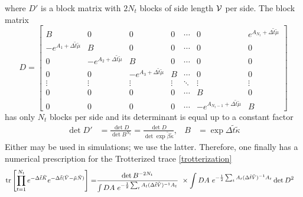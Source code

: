 where $D'$ is a block matrix with $2N_t$ blocks of side length $\mathcal{V}$ per side.
The block matrix
\begin{equation}
	D
	=
	\begin{bmatrix}
		B                                      & 0                                      & 0                                      & 0      & \cdots & 0                                            & e^{A_{N_t}+ \Delta \tilde{t} \tilde{\mu}}
	\\	-e^{A_1+ \Delta \tilde{t} \tilde{\mu}} & B                                      & 0                                      & 0      & \cdots & 0                                            & 0
	\\	0                                      & -e^{A_2+ \Delta \tilde{t} \tilde{\mu}} & B                                      & 0      & \cdots & 0                                            & 0
	\\	0                                      & 0                                      & -e^{A_3+ \Delta \tilde{t} \tilde{\mu}} & B      & \cdots & 0                                            & 0
	\\	\vdots                                 & \vdots                                 & \vdots                                 & \vdots & \ddots & \vdots                                       & \vdots
	\\	0                                      & 0                                      & 0                                      & 0      & \cdots & B                                            & 0
	\\	0                                      & 0                                      & 0                                      & 0      & \cdots & -e^{A_{N_t-1}+ \Delta \tilde{t} \tilde{\mu}} & B
	\end{bmatrix}
\end{equation} 
has only $N_t$ blocks per side and its determinant is equal up to a constant factor
\begin{align}
	\det D' &= \frac{ \det D }{ \det B^{N_t} } = \frac{ \det D }{ \det \exp \tilde{\beta} \tilde{\kappa} },
	&
	B &= \exp \Delta\tilde{t} \tilde{\kappa}
\end{align}
Either may be used in simulations; we use the latter.
Therefore, one finally has a numerical prescription for the Trotterized trace \eqref{trotterization}
\begin{align}
	\text{tr}\left[ \prod_{t=1}^{N_t} e^{-\Delta \tilde{t}\tilde{K}}  e^{-\Delta \tilde{t} (\tilde{V} - \tilde{\mu}\tilde{N})}  \right]
	=&
	\frac{\det B^{-2N_t}}{ \int DA ~ e^{-\frac{1}{2} \sum_t A_t (\Delta\tilde{t}\tilde{V})^{-1} A_t } } ~ \times
	\int DA ~ e^{-\frac{1}{2} \sum_t A_t (\Delta\tilde{t}\tilde{V})^{-1} A_t } \det D^2
\end{align}

